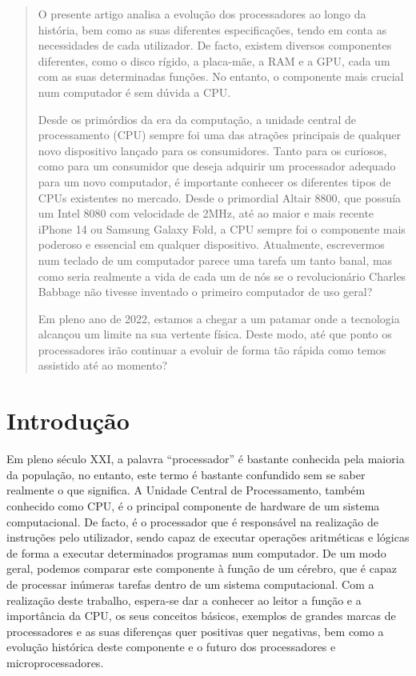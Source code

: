 \documentclass{report}
\begin{document}
\begin{abstract}
O presente artigo analisa a evolução dos processadores ao longo da história, bem como as suas diferentes especificações, tendo em conta as necessidades de cada utilizador. De facto, existem diversos componentes diferentes, como o disco rígido, a placa-mãe, a \ac{RAM} e a \ac{GPU}, cada um com as suas determinadas funções. No entanto, o componente mais crucial num computador é sem dúvida a \ac{CPU}.

Desde os primórdios da era da computação, a unidade central de processamento (\ac{CPU}) sempre foi uma das atrações principais de qualquer novo dispositivo lançado para os consumidores. Tanto para os curiosos, como para um consumidor que deseja adquirir um processador adequado para um novo computador, é importante conhecer os diferentes tipos de \ac{CPU}s existentes no mercado. Desde o primordial Altair 8800, que possuía um \ac{Intel} 8080 com velocidade de 2MHz, até ao maior e mais recente iPhone 14 ou Samsung Galaxy Fold, a \ac{CPU} sempre foi o componente mais poderoso e essencial em qualquer dispositivo. Atualmente, escrevermos num teclado de um computador parece uma tarefa um tanto banal, mas como seria realmente a vida de cada um de nós se o revolucionário Charles Babbage não tivesse inventado o primeiro computador de uso geral?

Em pleno ano de 2022, estamos a chegar a um patamar onde a tecnologia alcançou um limite na sua vertente física. Deste modo, até que ponto os processadores irão continuar a evoluir de forma tão rápida como temos assistido até ao momento?

\end{abstract}




\tableofcontents


\clearpage
{}

\chapter{Introdução}
\label{chap.introducao}
Em pleno século XXI, a palavra “processador” é bastante conhecida pela maioria da população, no entanto, este termo é bastante confundido sem se saber realmente o que significa. A Unidade Central de Processamento, também conhecido como \ac{CPU}, é o principal componente de hardware de um sistema computacional. De facto, é o processador que é responsável na realização de instruções pelo utilizador, sendo capaz de executar operações aritméticas e lógicas de forma a executar determinados programas num computador. De um modo geral, podemos comparar este componente à função de um cérebro, que é capaz de processar inúmeras tarefas dentro de um sistema computacional.
Com a realização deste trabalho, espera-se dar a conhecer ao leitor a função e a importância da \ac{CPU}, os seus conceitos básicos, exemplos de grandes marcas de processadores e as suas diferenças quer positivas quer negativas, bem como a evolução histórica deste componente e o futuro dos processadores e microprocessadores.
\end{document}
